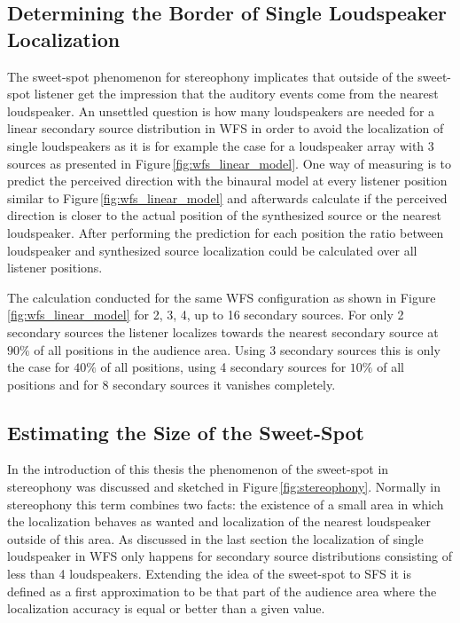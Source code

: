 \subsection{Determining the Border of Single Loudspeaker Localization}
\label{sec:determinig_the_border_of_single_loudspeaker_localization}
%
The sweet-spot phenomenon for stereophony implicates that outside
of the sweet-spot listener get the impression that the auditory events come from
the nearest loudspeaker. An unsettled question is how
many loudspeakers are needed for a linear secondary source distribution in
\ac{WFS} in order to avoid the localization of single loudspeakers as it is for
example the case for a loudspeaker array with 3 sources as presented in
Figure\,\ref{fig:wfs_linear_model}.
One way of measuring is to predict the perceived direction with the binaural
model at every listener position similar to Figure\,\ref{fig:wfs_linear_model} and
afterwards calculate if the perceived direction is closer to the actual position of the
synthesized source or the nearest loudspeaker. After performing the prediction for
each position the ratio between loudspeaker and synthesized source localization
could be calculated over all listener positions.

The calculation conducted for the same \ac{WFS} configuration as shown in
Figure\,\ref{fig:wfs_linear_model} for 2, 3, 4, up to 16 secondary sources.
For only 2 secondary sources the listener localizes towards the nearest
secondary source at $90\%$ of all positions in the audience area.
Using 3 secondary sources this is only the case for $40\%$ of all positions,
using 4 secondary sources for $10\%$ of all
positions and for 8 secondary sources it vanishes completely.


\subsection{Estimating the Size of the Sweet-Spot}
\label{sec:estimating_the_size_of_the_sweet_spot}
%
In the introduction of this thesis the phenomenon of the sweet-spot in stereophony was
discussed and sketched in Figure\,\ref{fig:stereophony}. Normally in stereophony
this term combines two facts: the existence of a small area in which the
localization behaves as wanted and localization of the nearest loudspeaker
outside of this area. As discussed in the last section the
localization of single loudspeaker in \ac{WFS} only happens for
secondary source distributions consisting of less than 4 loudspeakers.
Extending the idea of the sweet-spot to \ac{SFS} it is defined
as a first approximation to be that part of the audience area where
the localization accuracy is equal or better than a given value.

